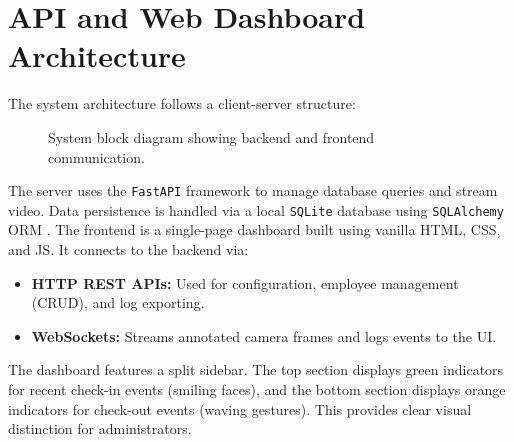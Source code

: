 \section{API and Web Dashboard Architecture}
The system architecture follows a client-server structure:
\begin{figure}[H]
\centering
{}
\caption{System block diagram showing backend and frontend communication.}
\label{fig:block-diagram}
\end{figure}

The server uses the \texttt{FastAPI} framework \cite{fastapi} to manage database queries and stream video. Data persistence is handled via a local \texttt{SQLite} database using \texttt{SQLAlchemy} ORM \cite{sqlalchemy}.
The frontend is a single-page dashboard built using vanilla HTML, CSS, and JS. It connects to the backend via:
\begin{itemize}
    \item \textbf{HTTP REST APIs:} Used for configuration, employee management (CRUD), and log exporting.
    \item \textbf{WebSockets:} Streams annotated camera frames and logs events to the UI.
\end{itemize}
The dashboard features a split sidebar. The top section displays green indicators for recent check-in events (smiling faces), and the bottom section displays orange indicators for check-out events (waving gestures). This provides clear visual distinction for administrators.
